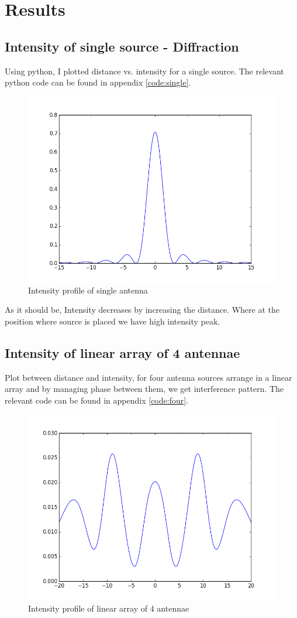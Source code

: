 \chapter{Results}

\section{Intensity of single source - Diffraction}

Using python, I plotted distance vs. intensity for a single source. The relevant python code can be found in appendix \ref{code:single}.

\begin{figure}[!h]
\centering	
\includegraphics[scale=0.45]{figure_1.png}
\caption{Intensity profile of single antenna}
\end{figure}

As it should be, Intensity decreases by increasing the distance. Where at the position where source is placed we have high intensity peak.

\section{Intensity of linear array of 4 antennae}

Plot between distance and intensity, for four antenna sources arrange in a linear array and by managing phase between them, we get interference pattern. The relevant code can be found in appendix \ref{code:four}.

\begin{figure}[!h]
	\centering	
    \includegraphics[scale=0.45]{figure_2.png}
	\caption{Intensity profile of linear array of 4 antennae}
\end{figure}

